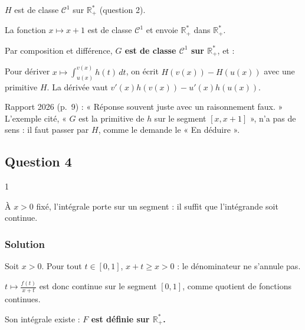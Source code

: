 \documentclass[11pt,a4paper]{article}
\newcommand{\equationajustee}[1]{%
  \sbox{\boiteequation}{$\displaystyle #1$}%
  \ifdim\wd\boiteequation>\linewidth
    \[\resizebox{\linewidth}{!}{\usebox{\boiteequation}}\]%
  \else
    \[#1\]%
  \fi}
\begin{document}
\(H\) est de classe \(\mathcal C^1\) sur \(\mathbb R_+^*\) (question 2).

La fonction \(x\mapsto x+1\) est de classe \(\mathcal C^1\) et envoie \(\mathbb R_+^*\) dans \(\mathbb R_+^*\).

Par composition et différence, \textbf{\(G\) est de classe \(\mathcal C^1\) sur \(\mathbb R_+^*\)}, et :

\equationajustee{\boxed{G'(x)=h(x+1)-h(x)}}

\begin{methode}

Pour dériver \(x\mapsto\int_{u(x)}^{v(x)}h(t)\,dt\), on écrit \(H(v(x))-H(u(x))\) avec une primitive \(H\). La dérivée vaut \(v'(x)h(v(x))-u'(x)h(u(x))\).

\end{methode}

\begin{jury}

Rapport 2026 (p.~9) : « Réponse souvent juste avec un raisonnement faux. » L'exemple cité, « \(G\) est la primitive de \(h\) sur le segment \([x,x+1]\) », n'a pas de sens : il faut passer par \(H\), comme le demande le « En déduire ».

\end{jury}

\hypertarget{question-4-1}{%
\subsection{Question 4}\label{question-4-1}}

\begin{indication}{1}

À \(x>0\) fixé, l'intégrale porte sur un segment : il suffit que l'intégrande soit continue.

\end{indication}

\hypertarget{solution-21}{%
\subsubsection{Solution}\label{solution-21}}

Soit \(x>0\). Pour tout \(t\in[0,1]\), \(x+t\ge x>0\) : le dénominateur ne s'annule pas.

\(t\mapsto\frac{f(t)}{x+t}\) est donc continue sur le segment \([0,1]\), comme quotient de fonctions continues.

Son intégrale existe : \textbf{\(F\) est définie sur \(\mathbb R_+^*\).}
\end{document}
